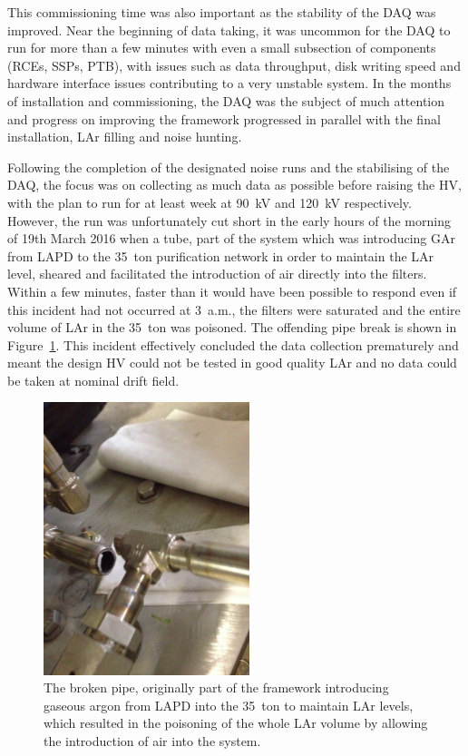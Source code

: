 This commissioning time was also important as the stability of the DAQ was improved.  Near the beginning of data taking, it was uncommon for the DAQ to run for more than a few minutes with even a small subsection of components (RCEs, SSPs, PTB), with issues such as data throughput, disk writing speed and hardware interface issues contributing to a very unstable system.  In the months of installation and commissioning, the DAQ was the subject of much attention and progress on improving the framework progressed in parallel with the final installation, LAr filling and noise hunting.

Following the completion of the designated noise runs and the stabilising of the DAQ, the focus was on collecting as much data as possible before raising the HV, with the plan to run for at least week at 90~kV and 120~kV respectively.  However, the run was unfortunately cut short in the early hours of the morning of 19th March 2016 when a tube, part of the system which was introducing GAr from LAPD to the 35~ton purification network in order to maintain the LAr level, sheared and facilitated the introduction of air directly into the filters.  Within a few minutes, faster than it would have been possible to respond even if this incident had not occurred at 3~a.m., the filters were saturated and the entire volume of LAr in the 35~ton was poisoned.  The offending pipe break is shown in Figure~\ref{fig:35tonPipeBreak}.  This incident effectively concluded the data collection prematurely and meant the design HV could not be tested in good quality LAr and no data could be taken at nominal drift field.

\begin{figure}
  \centering
  \includegraphics[width=6cm]{35tonPipeBreak.png}
  \caption[The broken pipe, originally part of the framework introducing gaseous argon from LAPD into the 35~ton to maintain LAr levels, which resulted in the poisoning of the whole LAr volume by allowing the introduction of air into the system.]{The broken pipe, originally part of the framework introducing gaseous argon from LAPD into the 35~ton to maintain LAr levels, which resulted in the poisoning of the whole LAr volume by allowing the introduction of air into the system.}
  \label{fig:35tonPipeBreak}
\end{figure}

